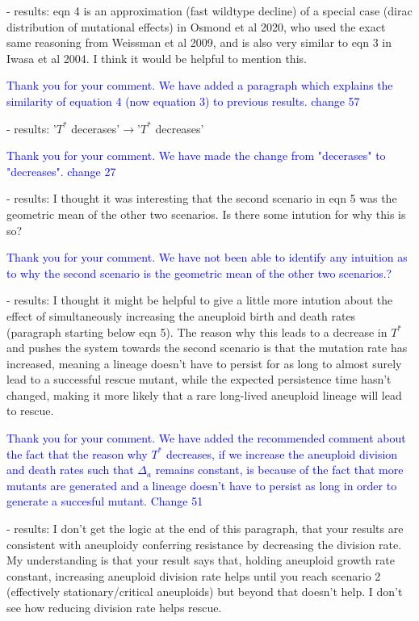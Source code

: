 \documentclass[11pt,a4paper]{article}
\begin{document}
- results: eqn 4 is an approximation (fast wildtype decline) of a special case (dirac distribution of mutational effects) in Osmond et al 2020, who used the exact same reasoning from Weissman et al 2009, and is also very similar to eqn 3 in Iwasa et al 2004. I think it would be helpful to mention this.

\textcolor{blue}{Thank you for your comment. We have added a paragraph which explains the similarity of equation 4 (now equation 3) to previous results. change 57} 

- results: '$T^*$ decerases'$\rightarrow$'$T^*$ decreases'

\textcolor{blue}{Thank you for your comment. We have made the change from "decerases" to "decreases". change 27} 

- results: I thought it was interesting that the second scenario in eqn 5 was the geometric mean of the other two scenarios. Is there some intution for why this is so?

\textcolor{blue}{Thank you for your comment. We have not been able to identify any intuition as to why the second scenario is the geometric mean of the other two scenarios.?} 

- results: I thought it might be helpful to give a little more intution about the effect of simultaneously increasing the aneuploid birth and death rates (paragraph starting below eqn 5). The reason why this leads to a decrease in $T^*$ and pushes the system towards the second scenario is that the mutation rate has increased, meaning a lineage doesn't have to persist for as long to almost surely lead to a successful rescue mutant, while the expected persistence time hasn't changed, making it more likely that a rare long-lived aneuploid lineage will lead to rescue.

\textcolor{blue}{Thank you for your comment. We have added the recommended comment about the fact that the reason why $T^*$ decreases, if we increase the aneuploid division and death rates such that $\Delta_a$ remains constant, is because of the fact that more mutants are generated and a lineage doesn't have to persist as long in order to generate a succesful mutant. Change 51 } 


- results: I don't get the logic at the end of this paragraph, that your results are consistent with aneuploidy conferring resistance by decreasing the division rate. My understanding is that your result says that, holding aneuploid growth rate constant, increasing aneuploid division rate helps until you reach scenario 2 (effectively stationary/critical aneuploids) but beyond that doesn't help. I don't see how reducing division rate helps rescue.
\end{document}
